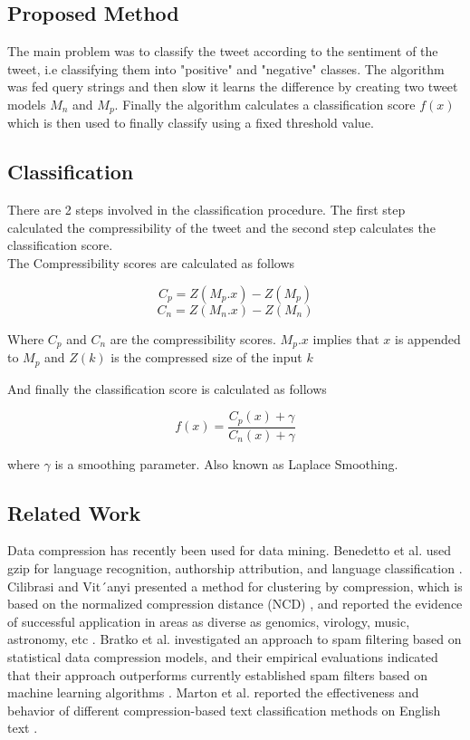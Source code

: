 \documentclass{article}
\begin{document}
\subsection{Proposed Method}

The main problem was to classify the tweet according to the sentiment of the tweet, i.e classifying them into "positive" and "negative" classes. The algorithm was fed query strings and then slow it learns the difference by creating two tweet models $M_n$ and $M_p$. Finally the algorithm calculates a classification score $f(x)$ which is then used to finally classify using a fixed threshold value.

\subsection{Classification}

There are 2 steps involved in the classification procedure. The first step calculated the compressibility of the tweet and the second step calculates the classification score. \\ 

The Compressibility scores are calculated as follows  \cite{10.1145/2064448.2064473}

$$C_p = Z(M_p . x) - Z(M_p)$$
$$C_n = Z(M_n . x) - Z(M_n)$$

Where $C_p$ and $C_n$ are the compressibility scores. $M_p . x$ implies that $x$ is appended to $M_p$ and $Z(k)$ is the compressed size of the input $k$ 

And finally the classification score is calculated as follows

$$
f(x) = \frac{C_p(x) + \gamma}{C_n(x) + \gamma}
$$

where $\gamma$ is a smoothing parameter. Also known as Laplace Smoothing. 

\subsection{Related Work}
Data compression has recently been used for data mining. Benedetto et al. used gzip for language recognition, authorship attribution, and language classification \cite{benedetto2002language}. Cilibrasi and Vit´anyi presented a method for clustering by compression, which is based on the normalized compression distance
(NCD) \cite{li2004similarity}, and reported the evidence of successful application in areas as diverse as genomics, virology, music, astronomy, etc \cite{cilibrasi2005clustering}. Bratko et al. investigated an approach to
spam filtering based on statistical data compression models, and their empirical evaluations indicated that their approach outperforms currently established spam filters based on machine learning algorithms \cite{bratko2006spam}. Marton et al. reported the effectiveness and behavior of different compression-based text classification methods on English text \cite{marton2005compression}.
\end{document}
